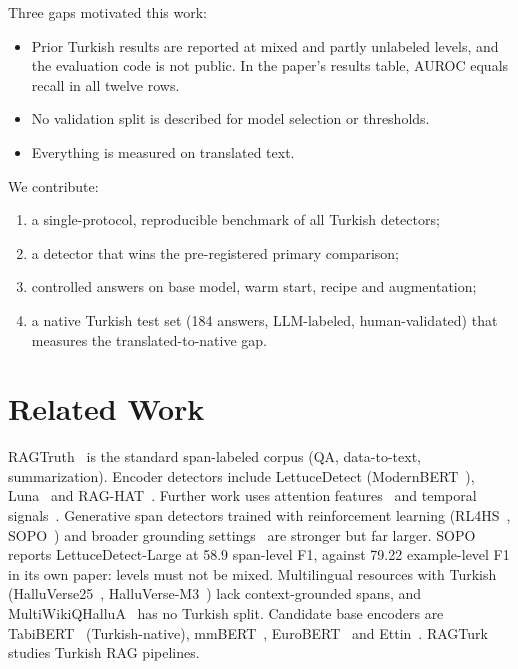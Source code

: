 \documentclass[conference,a4paper]{IEEEtran}
\begin{document}
Three gaps motivated this work:
\begin{itemize}
\item Prior Turkish results are reported at mixed and partly unlabeled levels, and the evaluation code is not public. In the paper's results table, AUROC equals recall in all twelve rows.
\item No validation split is described for model selection or thresholds.
\item Everything is measured on translated text.
\end{itemize}

We contribute:
\begin{enumerate}
\item a single-protocol, reproducible benchmark of all Turkish detectors;
\item a detector that wins the pre-registered primary comparison;
\item controlled answers on base model, warm start, recipe and augmentation;
\item a native Turkish test set (184 answers, LLM-labeled, human-validated) that measures the translated-to-native gap.
\end{enumerate}

\section{Related Work}
RAGTruth~\cite{niu2024ragtruth} is the standard span-labeled corpus (QA, data-to-text, summarization). Encoder detectors include LettuceDetect (ModernBERT~\cite{warner2024modernbert}), Luna~\cite{belyi2025luna} and RAG-HAT~\cite{song2024raghat}. Further work uses attention features~\cite{ogasa2025multiview} and temporal signals~\cite{itkin2026temporal}. Generative span detectors trained with reinforcement learning (RL4HS~\cite{su2025rl4hs}, SOPO~\cite{dong2026sopo}) and broader grounding settings~\cite{kovacs2026beyond} are stronger but far larger. SOPO reports LettuceDetect-Large at 58.9 span-level F1, against 79.22 example-level F1 in its own paper: levels must not be mixed. Multilingual resources with Turkish (HalluVerse25~\cite{abdaljalil2025halluverse25}, HalluVerse-M3~\cite{abdaljalil2026halluversem3}) lack context-grounded spans, and MultiWikiQHalluA~\cite{thoresen2026multiwiki} has no Turkish split. Candidate base encoders are TabiBERT~\cite{turker2025tabibert} (Turkish-native), mmBERT~\cite{marone2025mmbert}, EuroBERT~\cite{boizard2025eurobert} and Ettin~\cite{weller2025ettin}. RAGTurk~\cite{kose2026ragturk} studies Turkish RAG pipelines.
\end{document}
